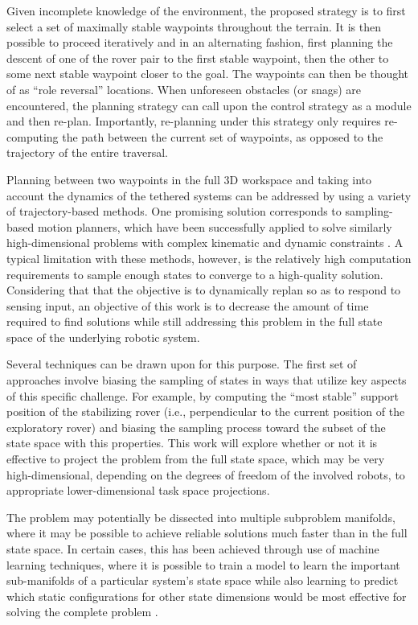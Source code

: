 \documentclass[12pt]{article}
\begin{document}
Given incomplete knowledge of the environment, the proposed strategy
is to first select a set of maximally stable waypoints throughout the
terrain. It is then possible to proceed iteratively and in an
alternating fashion, first planning the descent of one of the rover
pair to the first stable waypoint, then the other to some next stable
waypoint closer to the goal. The waypoints can then be thought of as
``role reversal'' locations. When unforeseen obstacles (or snags) are
encountered, the planning strategy can call upon the control strategy
as a module and then re-plan.  Importantly, re-planning under this
strategy only requires re-computing the path between the current set
of waypoints, as opposed to the trajectory of the entire traversal.


Planning between two waypoints in the full 3D workspace and taking
into account the dynamics of the tethered systems can be addressed by
using a variety of trajectory-based methods. One promising solution
corresponds to sampling-based motion planners, which have been
successfully applied to solve similarly high-dimensional problems with
complex kinematic and dynamic constraints \cite{zak_kino}. A typical
limitation with these methods, however, is the relatively high
computation requirements to sample enough states to converge to a
high-quality solution. Considering that that the objective is to
dynamically replan so as to respond to sensing input, an objective of
this work is to decrease the amount of time required to find solutions
while still addressing this problem in the full state space of the
underlying robotic system.


Several techniques can be drawn upon for this purpose. The first set
of approaches involve biasing the sampling of states in ways that
utilize key aspects of this specific challenge. For example, by
computing the ``most stable'' support position of the stabilizing
rover (i.e., perpendicular to the current position of the exploratory
rover) and biasing the sampling process toward the subset of the state
space with this properties. This work will explore whether or not it
is effective to project the problem from the full state space, which
may be very high-dimensional, depending on the degrees of freedom of
the involved robots, to appropriate lower-dimensional task space
projections.

The problem may potentially be dissected into multiple subproblem
manifolds, where it may be possible to achieve reliable solutions much
faster than in the full state space. In certain cases, this has been
achieved through use of machine learning techniques, where it is
possible to train a model to learn the important sub-manifolds of a
particular system's state space while also learning to predict which
static configurations for other state dimensions would be most
effective for solving the complete problem \cite{learning_biases}.
\end{document}
